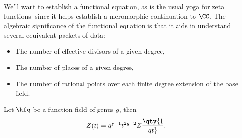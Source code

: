 We'll want to establish a functional equation, as is the usual yoga for
zeta functions, since it helps establish a meromorphic continuation to
\(\CC\). The algebraic significance of the functional equation is that
it aids in understand several equivalent packets of data:

\begin{itemize}
\item
  The number of effective divisors of a given degree,
\item
  The number of places of a given degree,
\item
  The number of rational points over each finite degree extension of the
  base field.
\end{itemize}

\begin{theorem}

Let \(\kfq\) be a function field of genus \(g\), then
\begin{align*}  
Z(t) = q^{g-1} t^{2g-2} Z\qty{1\over qt}
.\end{align*}

\end{theorem}

